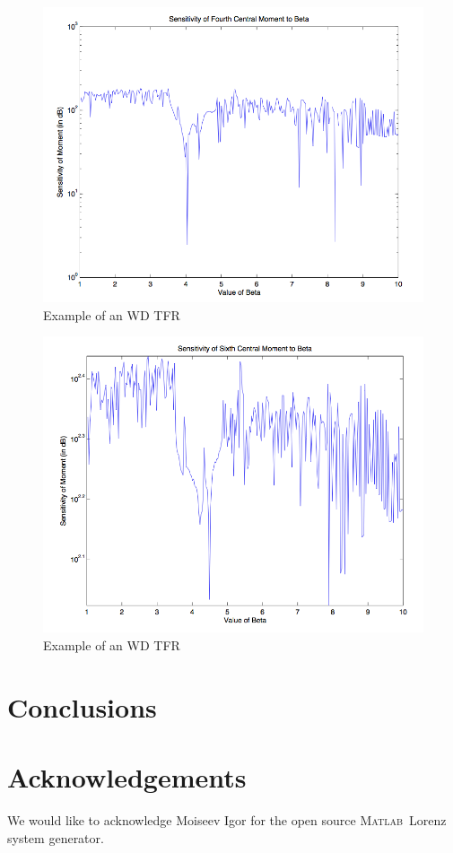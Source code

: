 \documentclass{article}[11pt]
\newcommand{\Matlab}{\textsc{Matlab}}
\begin{document}
\begin{figure}[H]
\centering
\includegraphics[scale = 0.6]{SensitivityFourth.png}
\caption{Example of an WD TFR}
\label{fig:WDTFR}
\end{figure}
\begin{figure}[H]
\centering
\includegraphics[scale = 0.6]{SensitivitySixth.png}
\caption{Example of an WD TFR}
\label{fig:WDTFR2}
\end{figure}

\section{Conclusions}
\label{sec:conclusion}


\section{Acknowledgements}
\label{sec:Ack}
We would like to acknowledge Moiseev Igor for the open source \Matlab \ Lorenz system generator.




\end{document}
